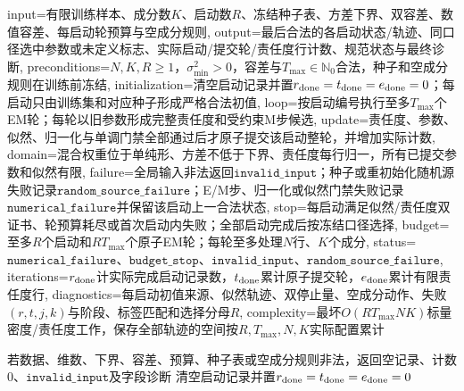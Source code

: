 \begin{AlgorithmContract}{
  input={有限训练样本、成分数$K$、启动数$R$、冻结种子表、方差下界、双容差、数值容差、每启动轮预算与空成分规则},
  output={最后合法的各启动状态/轨迹、同口径选中参数或未定义标志、实际启动/提交轮/责任度行计数、规范状态与最终诊断},
  preconditions={$N,K,R\ge1$，$\sigma_{\min}^2>0$，容差与$T_{\max}\in\mathbb N_0$合法，种子和空成分规则在训练前冻结},
  initialization={清空启动记录并置$r_{\rm done}=t_{\rm done}=e_{\rm done}=0$；每启动只由训练集和对应种子形成严格合法初值},
  loop={按启动编号执行至多$T_{\max}$个EM轮；每轮以旧参数形成完整责任度和受约束M步候选},
  update={责任度、参数、似然、归一化与单调门禁全部通过后才原子提交该启动整轮，并增加实际计数},
  domain={混合权重位于单纯形、方差不低于下界、责任度每行归一，所有已提交参数和似然有限},
  failure={全局输入非法返回$\mathtt{invalid\_input}$；种子或重初始化随机源失败记录$\mathtt{random\_source\_failure}$；E/M步、归一化或似然门禁失败记录$\mathtt{numerical\_failure}$并保留该启动上一合法状态},
  stop={每启动满足似然/责任度双证书、轮预算耗尽或首次启动内失败；全部启动完成后按冻结口径选择},
  budget={至多$R$个启动和$RT_{\max}$个原子EM轮；每轮至多处理$N$行、$K$个成分},
  status={$\mathtt{numerical\_failure}$、$\mathtt{budget\_stop}$、$\mathtt{invalid\_input}$、$\mathtt{random\_source\_failure}$},
  iterations={$r_{\rm done}$计实际完成启动记录数，$t_{\rm done}$累计原子提交轮，$e_{\rm done}$累计有限责任度行},
  diagnostics={每启动初值来源、似然轨迹、双停止量、空成分动作、失败$(r,t,j,k)$与阶段、标签匹配和选择分母$R$},
  complexity={最坏$O(RT_{\max}NK)$标量密度/责任度工作，保存全部轨迹的空间按$R,T_{\max},N,K$实际配置累计}
}
\begin{algorithm}[H]
\caption{受约束高斯混合模型的多启动EM}\label{alg:V3-C04-gmm}
若数据、维数、下界、容差、预算、种子表或空成分规则非法，返回空记录、计数$0$、$\mathtt{invalid\_input}$及字段诊断\;
清空启动记录并置$r_{\rm done}=t_{\rm done}=e_{\rm done}=0$\;
\end{algorithm}
\end{AlgorithmContract}
